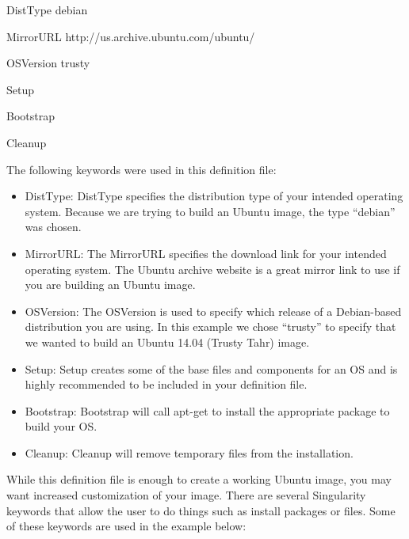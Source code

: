 \documentclass[letterpaper,10pt,english]{sphinxmanual}
\begin{document}
%
\begin{sphinxVerbatim}[commandchars=\\\{\}]
DistType \PYGZdq{}debian\PYGZdq{}

MirrorURL \PYGZdq{}http://us.archive.ubuntu.com/ubuntu/\PYGZdq{}

OSVersion \PYGZdq{}trusty\PYGZdq{}



Setup

Bootstrap



Cleanup
\end{sphinxVerbatim}

The following keywords were used in this definition file:
\begin{itemize}
\item {} 
DistType: DistType specifies the distribution type of your intended operating system. Because we are trying to build an Ubuntu image, the type “debian” was chosen.

\item {} 
MirrorURL: The MirrorURL specifies the download link for your intended operating system. The Ubuntu archive website is a great mirror link to use if you are building an Ubuntu image.

\item {} 
OSVersion: The OSVersion is used to specify which release of a Debian-based distribution you are using. In this example we chose “trusty” to specify that we wanted to build an Ubuntu
14.04 (Trusty Tahr) image.

\item {} 
Setup: Setup creates some of the base files and components for an OS and is highly recommended to be included in your definition file.

\item {} 
Bootstrap: Bootstrap will call apt-get to install the appropriate package to build your OS.

\item {} 
Cleanup: Cleanup will remove temporary files from the installation.

\end{itemize}

While this definition file is enough to create a working Ubuntu image, you may want increased customization of your image. There are several Singularity keywords that allow the user to do
things such as install packages or files. Some of these keywords are used in the example below:
\end{document}
